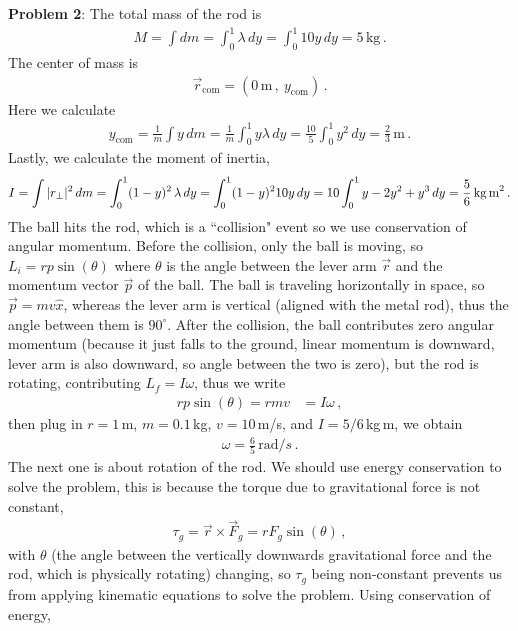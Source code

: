\documentclass[11pt]{article}
\begin{document}
\newpage
\noindent\textbf{Problem 2}: The total mass of the rod is 
\begin{align*}
M = \int dm = \int_{0}^1 \lambda\, dy = \int_0^1 10y \, dy =5 \,\text{kg}\,.
\end{align*}
The center of mass is 
\begin{align*}
\vec{r}_{\text{com}} = \left(0\,\text{m}\,,\ y_{\text{com}}\right)\,.
\end{align*}
Here we calculate
\begin{align*}
y_{\text{com}} =\frac{1}{m} \int y \, dm =\frac{1}{m} \int_0^1 y \lambda \,dy =\frac{10}{5} \int_0^1 y^2 \, dy = \frac{2}{3} \,\text{m}\,.
\end{align*}
Lastly, we calculate the moment of inertia, 
\begin{align*}
I = \int |r_\perp|^2\, dm = \int_0^1 (1-y)^2 \, \lambda \, dy =  \int_0^1 (1-y)^210y \, dy =10 \int_0^1 y-2y^2 + y^3\, dy = \frac{5}{6} \, \text{kg\,m}^2\,.
\end{align*}
The ball hits the rod, which is a ``collision" event so we use conservation of angular momentum. Before the collision, only the ball is moving, so $L_{i} = rp \sin(\theta)$ where $\theta$ is the angle between the lever arm $\vec{r}$ and the momentum vector $\vec{p}$ of the ball. The ball is traveling horizontally in space, so $\vec{p} = m v \hat{x}$, whereas the lever arm is vertical (aligned with the metal rod), thus the angle between them is $90^\circ$. After the collision, the ball contributes zero angular momentum (because it just falls to the ground, linear momentum is downward, lever arm is also downward, so angle between the two is zero), but the rod is rotating, contributing $L_f = I\omega$, thus we write
\begin{align*}
rp\sin(\theta)=rmv &= I\omega\,,
\end{align*}
then plug in $r = 1$\,m, $m = 0.1$\,kg, $v = 10\,$m/s, and $I = 5/6$\,kg\,m, we obtain 
\begin{align*}
\omega = \frac{6}{5} \,\text{rad}/s\,.
\end{align*}
The next one is about rotation of the rod. We should use energy conservation to solve the problem, this is because the torque due to gravitational force is not constant, 
\begin{align*}
\tau_g = \vec{r}\times \vec{F}_g = r F_g \sin(\theta)\,,
\end{align*}
with $\theta$ (the angle between the vertically downwards gravitational force and the rod, which is physically rotating) changing, so $\tau_g$ being non-constant prevents us from applying kinematic equations to solve the problem. Using conservation of energy, 
\end{document}
